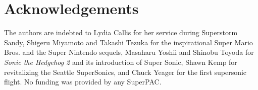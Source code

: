 \section*{Acknowledgements}

The authors are indebted to Lydia Callis for her service during Superstorm Sandy, Shigeru Miyamoto and Takashi Tezuka for the inspirational Super Mario Bros.\cite{mario} and the Super Nintendo sequels, Masaharu Yoshii and Shinobu Toyoda for \textit{Sonic the Hedgehog 2}\cite{sonic2} and its introduction of Super Sonic, Shawn Kemp for revitalizing the Seattle SuperSonics, and Chuck Yeager for the first supersonic flight.
No funding was provided by any SuperPAC.